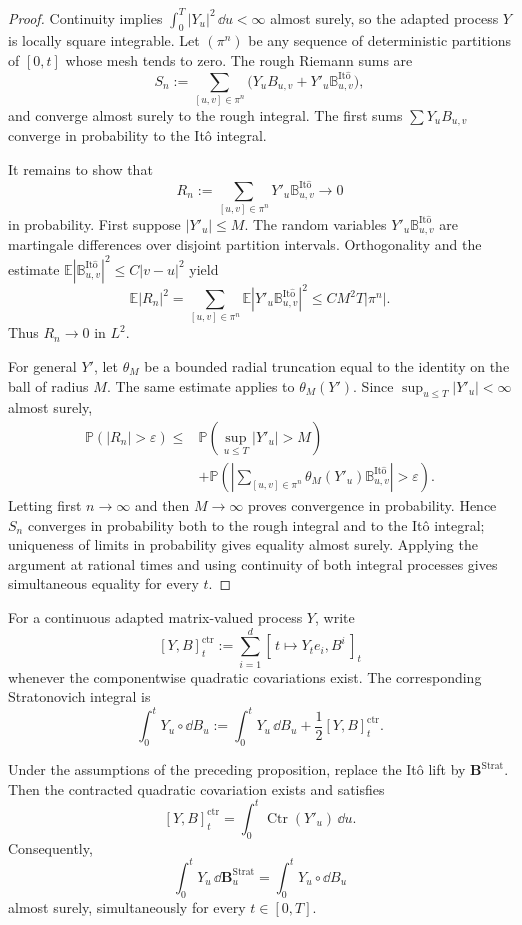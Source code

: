 \begin{proof}
Continuity implies $\int_0^T|Y_u|^2\,\dd u<\infty$ almost surely, so the
adapted process $Y$ is locally square integrable.  Let $(\pi^n)$ be any
sequence of deterministic partitions of $[0,t]$ whose mesh tends to zero.
The rough Riemann sums are
\[
  S_n:=\sum_{[u,v]\in\pi^n}
       \bigl(Y_uB_{u,v}+Y'_u\mathbb B^{\mathrm{It\hat{o}}}_{u,v}\bigr),
\]
and converge almost surely to the rough integral.  The first sums
$\sum Y_uB_{u,v}$ converge in probability to the It\^o integral.

It remains to show that
\[
  R_n:=\sum_{[u,v]\in\pi^n}
       Y'_u\mathbb B^{\mathrm{It\hat{o}}}_{u,v}
  \longrightarrow0
\]
in probability.  First suppose $|Y'_u|\le M$.  The random variables
$Y'_u\mathbb B^{\mathrm{It\hat{o}}}_{u,v}$ are martingale differences over
disjoint partition intervals.  Orthogonality and the estimate
$\mathbb E|\mathbb B^{\mathrm{It\hat{o}}}_{u,v}|^2\le C|v-u|^2$ yield
\[
  \mathbb E|R_n|^2
  =\sum_{[u,v]\in\pi^n}
    \mathbb E|Y'_u\mathbb B^{\mathrm{It\hat{o}}}_{u,v}|^2
  \le CM^2T|\pi^n|.
\]
Thus $R_n\to0$ in $L^2$.

For general $Y'$, let $\theta_M$ be a bounded radial truncation equal to the
identity on the ball of radius $M$.  The same estimate applies to
$\theta_M(Y')$.  Since $\sup_{u\le T}|Y'_u|<\infty$ almost surely,
\begin{align*}
\mathbb P(|R_n|>\varepsilon)
\le{}&\mathbb P\left(\sup_{u\le T}|Y'_u|>M\right)\\
&+\mathbb P\left(\left|\sum_{[u,v]\in\pi^n}
 \theta_M(Y'_u)\mathbb B^{\mathrm{It\hat{o}}}_{u,v}\right|>
 \varepsilon\right).
\end{align*}
Letting first $n\to\infty$ and then $M\to\infty$ proves convergence in
probability.  Hence $S_n$ converges in probability both to the rough integral
and to the It\^o integral; uniqueness of limits in probability gives equality
almost surely.  Applying the argument at rational times and using continuity
of both integral processes gives simultaneous equality for every $t$.
\end{proof}

For a continuous adapted matrix-valued process $Y$, write
\[
  [Y,B]^{\operatorname{ctr}}_t
  :=\sum_{i=1}^d[\,t\mapsto Y_t e_i,B^i\,]_t
\]
whenever the componentwise quadratic covariations exist.  The corresponding
Stratonovich integral is
\[
  \int_0^tY_u\circ\dd B_u
  :=\int_0^tY_u\,\dd B_u
    +\frac12[Y,B]^{\operatorname{ctr}}_t.
\]

\begin{prop}
Under the assumptions of the preceding proposition, replace the It\^o lift by
$\mathbf B^{\mathrm{Strat}}$.  Then the contracted quadratic covariation
exists and satisfies
\[
  [Y,B]^{\operatorname{ctr}}_t
  =\int_0^t\operatorname{Ctr}(Y'_u)\,\dd u.
\]
Consequently,
\[
  \int_0^tY_u\,\dd\mathbf B^{\mathrm{Strat}}_u
  =\int_0^tY_u\circ\dd B_u
\]
almost surely, simultaneously for every $t\in[0,T]$.
\end{prop}


